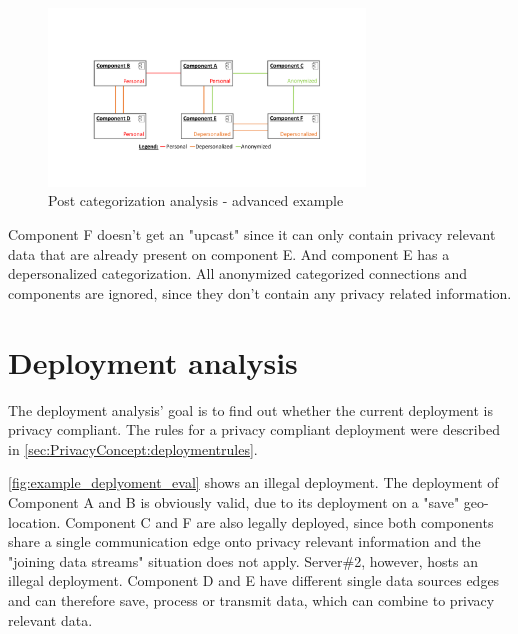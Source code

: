 \begin{figure}[h]
	\centering
	\includegraphics[trim = 35mm 40mm 40mm 45mm, clip, width=0.75\textwidth]{graphs/component_categorization_examples_upcast_advanced}
	\caption{Post categorization analysis - advanced example}
	\label{fig:example_categorization:advanced}
\end{figure}

Component F doesn't get an "upcast" since it can only contain privacy relevant data that are already present on component E. And component E has a depersonalized categorization. All anonymized categorized connections and components are ignored, since they don't contain any privacy related information.


\section{Deployment analysis}
\label{sec:PrivacyAnalysis:deployment}

The deployment analysis' goal is to find out whether the current deployment is privacy compliant. The rules for a privacy compliant deployment were described in \autoref{sec:PrivacyConcept:deploymentrules}.

\autoref{fig:example_deplyoment_eval} shows an illegal deployment. The deployment of Component A and B is obviously valid, due to its deployment on a "save" geo-location. Component C and F are also legally deployed, since both components share a single communication edge onto privacy relevant information and the "joining data streams" situation does not apply. Server\#2, however, hosts an illegal deployment. Component D and E have different single data sources edges and can therefore save, process or transmit data, which can combine to privacy relevant data.


